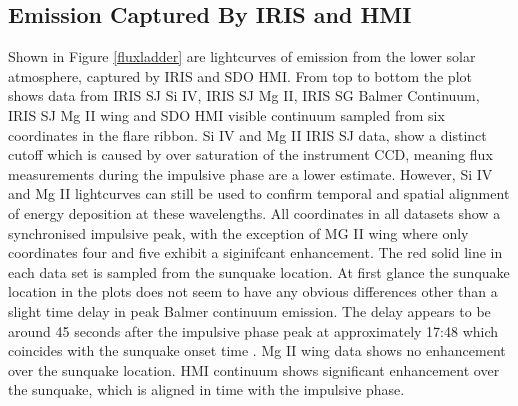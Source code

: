 \subsection{Emission Captured By IRIS and HMI}
Shown in Figure \ref{fluxladder} are lightcurves of emission from the lower solar atmosphere, captured by IRIS and SDO HMI. From top to bottom the plot shows data from IRIS SJ Si IV, IRIS SJ Mg II, IRIS SG Balmer Continuum, IRIS SJ Mg II wing and SDO HMI visible continuum sampled from six coordinates in the flare ribbon. Si IV and Mg II IRIS SJ data, show a distinct cutoff which is caused by over saturation of the instrument CCD, meaning flux measurements during the impulsive phase are a lower estimate. However, Si IV and Mg II lightcurves can still be used to confirm temporal and spatial alignment of energy deposition at these wavelengths. All coordinates in all datasets show a synchronised impulsive peak, with the exception of MG II wing where only coordinates four and five exhibit a siginifcant enhancement. The red solid line in each data set is sampled from the sunquake location. At first glance the sunquake location in the plots does not seem to have any obvious differences other than a slight time delay in peak Balmer continuum emission. The delay appears to be around 45 seconds after the impulsive phase peak at approximately 17:48 which coincides with the sunquake onset time \citep{2015ApJ...812...35M}. Mg II wing data shows no enhancement over the sunquake location. HMI continuum shows significant enhancement over the sunquake, which is aligned in time with the impulsive phase. 


